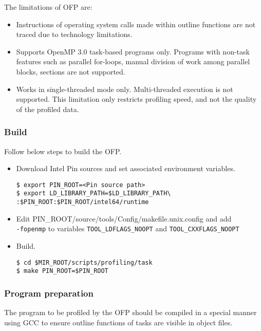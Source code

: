 \documentclass[11pt,a4paper]{article}
\begin{document}
The limitations of OFP are:
\begin{itemize}
    \item Instructions of operating system calls made within outline functions are not traced due to technology limitations.
    \item Supports OpenMP 3.0 task-based programs only. Programs with non-task features such as parallel for-loops, manual division of work among parallel blocks, sections are not supported.
    \item Works in single-threaded mode only. Multi-threaded execution is not supported. This limitation only restricts profiling speed, and not the quality of the profiled data.
\end{itemize}

\subsubsection{Build}

Follow below steps to build the OFP.

\begin{itemize}
    \item Download Intel Pin sources and set associated environment variables.

\begin{lstlisting}[style=MyInputStyle]
$ export PIN_ROOT=<Pin source path>
$ export LD_LIBRARY_PATH=$LD_LIBRARY_PATH\
:$PIN_ROOT:$PIN_ROOT/intel64/runtime
\end{lstlisting}

    \item Edit \textsf{PIN\_ROOT/source/tools/Config/makefile.unix.config} and add \\ \texttt{-fopenmp} to variables \texttt{TOOL\_LDFLAGS\_NOOPT}  and \texttt{TOOL\_CXXFLAGS\_NOOPT}

    \item Build.

\begin{lstlisting}[style=MyInputStyle]
$ cd $MIR_ROOT/scripts/profiling/task
$ make PIN_ROOT=$PIN_ROOT
\end{lstlisting}
\end{itemize}

\subsubsection{Program preparation}

The program to be profiled by the OFP should be compiled in a special manner using GCC to ensure outline functions of tasks are visible in object files.
\end{document}

